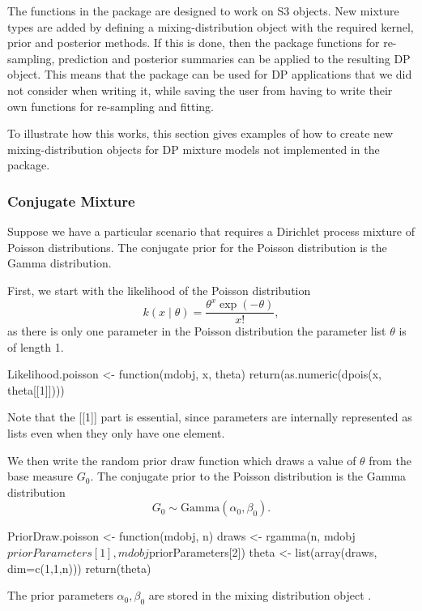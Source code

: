 \documentclass[nojss]{jss}
\begin{document}
The functions in the package are designed to work on S3  objects. New mixture types are added by defining a mixing-distribution object with the required kernel, prior and posterior methods. If this is done, then the package functions for re-sampling, prediction and posterior summaries can be applied to the resulting DP object. This means that the package can be used for DP applications that we did not consider when writing it, while saving the user from having to write their own functions for re-sampling and fitting.

To illustrate how this works, this section gives examples of how to create new mixing-distribution objects for DP mixture models not implemented in the  package.

\subsubsection{Conjugate Mixture}
Suppose we have a particular scenario that requires a Dirichlet process mixture of Poisson distributions. The conjugate prior for the Poisson distribution is the Gamma distribution.

First, we start with the likelihood of the Poisson distribution
\begin{equation*}
k(x \mid \theta) = \frac{\theta ^x \exp(-\theta)}{x!},
\end{equation*}
as there is only one parameter in the Poisson distribution the parameter list $\theta$ is of length 1.
\begin{CodeInput}
Likelihood.poisson <- function(mdobj, x, theta){
  return(as.numeric(dpois(x, theta[[1]])))
}
\end{CodeInput}
Note that the [[1]] part is essential, since parameters are internally represented as lists even when they only have one element.

We then write the random prior draw function which draws a value of $\theta$ from the base measure $G_0$. The conjugate prior to the Poisson distribution is the Gamma distribution
\begin{equation*}
G_0 \sim \text{Gamma} (\alpha _0, \beta _0).
\end{equation*}
\begin{CodeInput}
PriorDraw.poisson <- function(mdobj, n){
  draws <- rgamma(n, mdobj$priorParameters[1], mdobj$priorParameters[2])
  theta <- list(array(draws, dim=c(1,1,n)))
  return(theta)
 }
\end{CodeInput}
The prior parameters $\alpha_0, \beta_0$ are stored in the mixing distribution object .
\end{document}
